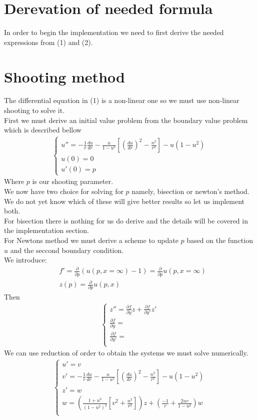 \documentclass{article}
\begin{document}
\section{Derevation of needed formula}
In order to begin the implementation we need to first derive the needed expressions from (1) and (2).
\section{Shooting method}
The differential equation in (1) is a non-linear one so we must use non-linear shooting to solve it. \\
First we must derive an initial value problem from the boundary value problem which is described bellow 
\begin{align}
\begin{cases}
u'' = -\frac{1}{r}\frac{du}{dr} - \frac{u}{1-u^2}\left[\left(\frac{du}{dr}\right)^2 - \frac{n^2}{r^2}\right] - u(1-u^2) \\
u(0) = 0 \\
u'(0) = p
\end{cases}
\end{align}
Where $p$ is our shooting parameter. \\
We now have two choice for solving for $p$ namely, bisection or newton's method. 
We do not yet know which of these will give better results so let us implement both.  \\
For bisection there is nothing for us do derive and the details will be covered in the implementation section. \\
For Newtons method we must derive a scheme to update $p$ based on the function $u$ and the seccond boundary condition.\\ 
We introduce:
\begin{align}
&f' = \frac{\partial }{\partial p}\left(u(p,x=\infty)-1\right) =  \frac{\partial }{\partial p} u(p,x=\infty) \\
&z(p) = \frac{\partial }{\partial p} u(p,x)
\end{align}
Then 
\begin{align}
\begin{cases}
z'' = \frac{\partial f}{\partial y}z + \frac{\partial f}{\partial y'}z' \\
 \frac{\partial f}{\partial y} = \\
 \frac{\partial f}{\partial y'} = \\
\end{cases}
\end{align}
We can use reduction of order to obtain the systems we must solve numerically. 
\begin{align}
\begin{cases}
u' = v \\
v' = -\frac{1}{r}\frac{du}{dr} - \frac{u}{1-u^2}\left[\left(\frac{du}{dr}\right)^2 - \frac{n^2}{r^2}\right] - u(1-u^2) \\
z' = w \\
w = \left(\frac{1+u^2}{(1-u^2)^2}\left[ v^2 + \frac{n^2}{r^2} \right] \right)z + \left(\frac{-1}{r} + \frac{2uv}{1-u^2}\right)w \\
\end{cases}
\end{align}
\end{document}
